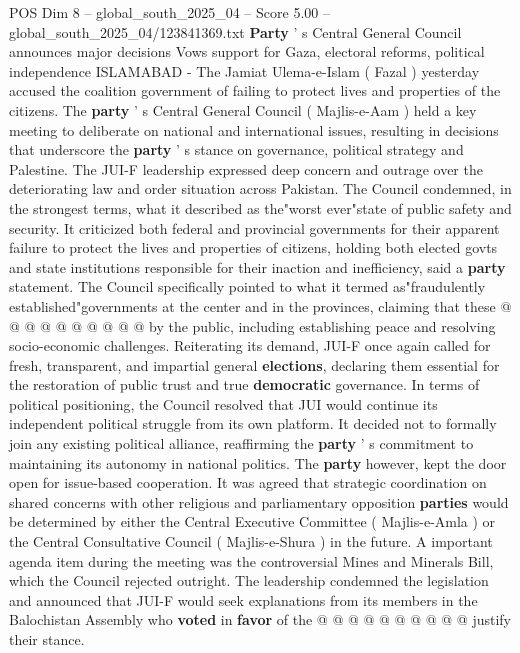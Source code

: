 \begin{textsample}{POS Dim 8 – global\_south\_2025\_04 – Score 5.00 – global\_south\_2025\_04/123841369.txt}  \label{ex:f8_pos_410}
\textbf{Party} ' s Central General Council announces major decisions Vows support for Gaza, electoral reforms, political independence ISLAMABAD - The Jamiat Ulema-e-Islam ( Fazal ) yesterday accused the coalition government of failing to protect lives and properties of the citizens.
The \textbf{party} ' s Central General Council ( Majlis-e-Aam ) held a key meeting to deliberate on national and international issues, resulting in decisions that underscore the \textbf{party} ' s stance on governance, political strategy and Palestine.
The JUI-F leadership expressed deep concern and outrage over the deteriorating law and order situation across Pakistan.
The Council condemned, in the strongest terms, what it described as the"worst ever"state of public safety and security.
It criticized both federal and provincial governments for their apparent failure to protect the lives and properties of citizens, holding both elected govts and state institutions responsible for their inaction and inefficiency, said a \textbf{party} statement.
The Council specifically pointed to what it termed as"fraudulently established"governments at the center and in the provinces, claiming that these @ @ @ @ @ @ @ @ @ @ by the public, including establishing peace and resolving socio-economic challenges.
Reiterating its demand, JUI-F once again called for fresh, transparent, and impartial general \textbf{elections}, declaring them essential for the restoration of public trust and true \textbf{democratic} governance.
In terms of political positioning, the Council resolved that JUI would continue its independent political struggle from its own platform.
It decided not to formally join any existing political alliance, reaffirming the \textbf{party} ' s commitment to maintaining its autonomy in national politics.
The \textbf{party} however, kept the door open for issue-based cooperation.
It was agreed that strategic coordination on shared concerns with other religious and parliamentary opposition \textbf{parties} would be determined by either the Central Executive Committee ( Majlis-e-Amla ) or the Central Consultative Council ( Majlis-e-Shura ) in the future.
A important agenda item during the meeting was the controversial Mines and Minerals Bill, which the Council rejected outright.
The leadership condemned the legislation and announced that JUI-F would seek explanations from its members in the Balochistan Assembly who \textbf{voted} in \textbf{favor} of the @ @ @ @ @ @ @ @ @ @ justify their stance.

\end{textsample}
